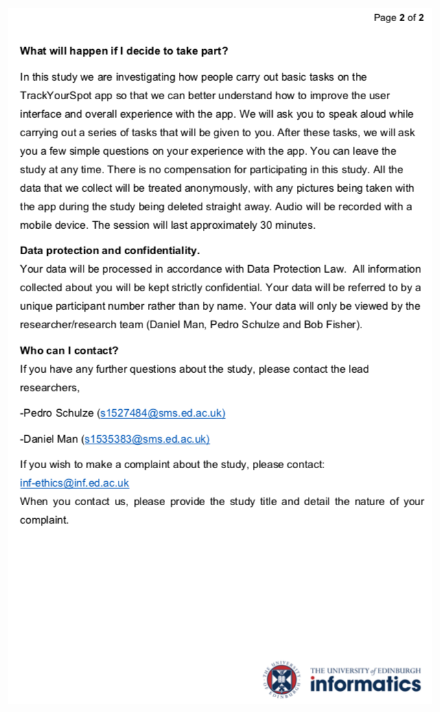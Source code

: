\begin{figure}[H]
    \includegraphics[width=1\textwidth, center]{figures/participantinfosheet2.png}
\end{figure}

